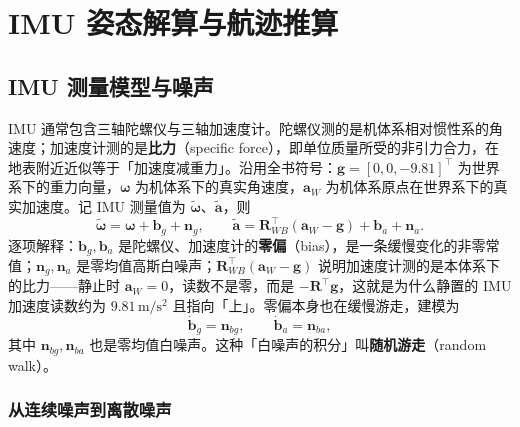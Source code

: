 ﻿\chapter{IMU 姿态解算与航迹推算}\label{ch:06-imu}


\section{IMU 测量模型与噪声}\label{sec:06-model}

IMU 通常包含三轴陀螺仪与三轴加速度计。陀螺仪测的是机体系相对惯性系的角速度；加速度计测的是\textbf{比力}（specific force），即单位质量所受的非引力合力，在地表附近近似等于「加速度减重力」。沿用全书符号：$\bm{g}=[0,0,-9.81]^{\top}$ 为世界系下的重力向量，$\bm{\omega}$ 为机体系下的真实角速度，$\bm{a}_W$ 为机体系原点在世界系下的真实加速度。记 IMU 测量值为 $\tilde{\bm{\omega}}$、$\tilde{\bm{a}}$，则
\begin{equation}
  \tilde{\bm{\omega}} = \bm{\omega} + \bm{b}_g + \bm{n}_g,
  \qquad
  \tilde{\bm{a}} = \bm{R}_{WB}^{\top}\left(\bm{a}_W - \bm{g}\right) + \bm{b}_a + \bm{n}_a.
  \label{eq:06-measure}
\end{equation}
逐项解释：$\bm{b}_g,\bm{b}_a$ 是陀螺仪、加速度计的\textbf{零偏}（bias），是一条缓慢变化的非零常值；$\bm{n}_g,\bm{n}_a$ 是零均值高斯白噪声；$\bm{R}_{WB}^{\top}(\bm{a}_W-\bm{g})$ 说明加速度计测的是本体系下的比力——静止时 $\bm{a}_W=0$，读数不是零，而是 $-\bm{R}^{\top}\bm{g}$，这就是为什么静置的 IMU 加速度读数约为 $9.81\,\mathrm{m/s^2}$ 且指向「上」。零偏本身也在缓慢游走，建模为
\begin{equation}
  \dot{\bm{b}}_g = \bm{n}_{bg},
  \qquad
  \dot{\bm{b}}_a = \bm{n}_{ba},
  \label{eq:06-bias-rw}
\end{equation}
其中 $\bm{n}_{bg},\bm{n}_{ba}$ 也是零均值白噪声。这种「白噪声的积分」叫\textbf{随机游走}（random walk）。

\subsection{从连续噪声到离散噪声}

